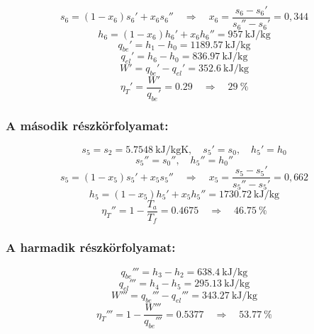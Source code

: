 \begin{equation*}
   s_6=\left (1-x_6 \right) s_6' + x_6 s_6''
   \quad
   \Rightarrow
   \quad
   x_6=\dfrac{s_6 - s_6'} {s_6'' - s_6'}=0,344
\end{equation*}
  \begin{equation*}
	h_6=\left (1-x_6 \right)h_6'+x_6 h_6''=\SI{957}{\kilo\joule\per\kilogram}
\end{equation*}
  \begin{equation*}
	q_{be}'=h_1-h_0=\SI{1189.57}{\kilo\joule\per\kilogram}
\end{equation*}
  \begin{equation*}
	q_{el}'=h_6-h_0=\SI{836.97}{\kilo\joule\per\kilogram}
\end{equation*}
  \begin{equation*}
	W'=q_{be}'-q_{el}'=\SI{352.6}{\kilo\joule\per\kilogram}
\end{equation*}
  \begin{equation*}
	\eta_T'=\dfrac{W'}{q_{be}'}=\SI{0.29}
	\quad
	\Rightarrow
	\quad
	\SI{29}{\%}
\end{equation*}
 \subsubsection{A második részkörfolyamat:}
  \begin{equation*}
  	s_5=s_2=\SI{5.7548}{\kilo\joule\per\kilogram\kelvin},
 	\quad
 	s_5'=s_0,
 	\quad
 	h_5'=h_0	
 \end{equation*}
  \begin{equation*}
 	s_5''=s_0'',
 	\quad
 	h_5''=h_0''	
 \end{equation*}
\begin{equation*}
s_5=\left (1-x_5 \right) s_5' + x_5 s_5''
\quad
\Rightarrow
\quad
x_5=\dfrac{s_5 - s_5'} {s_5'' - s_5'}=0,662
\end{equation*}
 \begin{equation*}
	h_5=\left (1-x_5 \right)h_5'+x_5 h_5''=\SI{1730.72}{\kilo\joule\per\kilogram}
\end{equation*}
   \begin{equation*}
 	\eta_T''=1-\dfrac{T_a}{T_f}=\SI{0.4675}
 	\quad
 	\Rightarrow
 	\quad
 	\SI{46.75}{\%}
 \end{equation*}
 \subsubsection{A harmadik részkörfolyamat:}
   \begin{equation*}
 	q_{be}'''=h_3-h_2=\SI{638.4}{\kilo\joule\per\kilogram}
 \end{equation*}
   \begin{equation*}
	q_{el}'''=h_4-h_5=\SI{295.13}{\kilo\joule\per\kilogram}
\end{equation*}
  \begin{equation*}
	W'''=q_{be}'''-q_{el}'''=\SI{343.27}{\kilo\joule\per\kilogram}
\end{equation*}
   \begin{equation*}
	\eta_T'''=1-\dfrac{W'''}{q_{be}'''}=\SI{0.5377}
	\quad
	\Rightarrow
	\quad
	\SI{53.77}{\%}
\end{equation*}

